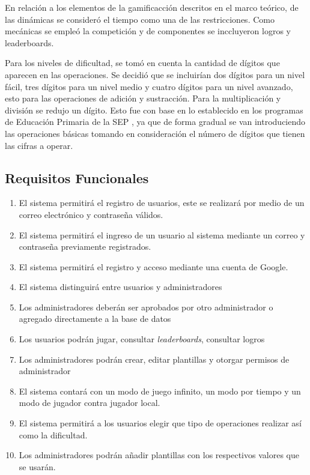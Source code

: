\documentclass{article}
\begin{document}
En relación a los elementos de la gamificacción descritos en el marco teórico, de las dinámicas se consideró el tiempo como una de las restricciones. Como mecánicas se empleó la competición y de componentes se inccluyeron logros y leaderboards. 

Para los niveles de dificultad, se tomó en cuenta la cantidad de dígitos que aparecen en las operaciones. Se decidió que se incluirían dos dígitos para un  nivel fácil, tres dígitos para un nivel medio y cuatro dígitos para un nivel avanzado, esto para las operaciones de adición y sustracción. Para la multiplicación y división se redujo un dígito. Esto fue con base en lo establecido en los programas de Educación Primaria de la SEP \cite{aprendizajes2018clave}, ya que de forma gradual se van introduciendo las operaciones básicas tomando en consideración el número de dígitos que tienen las cifras a operar.



\subsection{Requisitos Funcionales}
\begin{enumerate}
\item {El sistema permitirá el registro de usuarios, este se realizará por medio de un correo electrónico y contraseña válidos.}
\item{El sistema permitirá el ingreso de un usuario al sistema mediante un correo y contraseña  previamente registrados.}
\item {El sistema permitirá el registro y acceso mediante una cuenta de Google.}
\item{El sistema distinguirá entre usuarios y administradores}
\item{Los administradores deberán ser aprobados por otro administrador o agregado directamente a la base de datos}
\item{Los usuarios podrán jugar, consultar \emph{leaderboards}, consultar logros}
\item{Los administradores podrán crear, editar plantillas y otorgar permisos de administrador}
\item {El sistema contará con un modo de juego infinito, un modo por tiempo y un modo de jugador contra jugador local.}
\item{El sistema permitirá a los usuarios elegir que tipo de operaciones realizar así como la dificultad.}
\item{Los administradores podrán añadir plantillas con los respectivos valores que se usarán.}
\end{enumerate}
\end{document}
